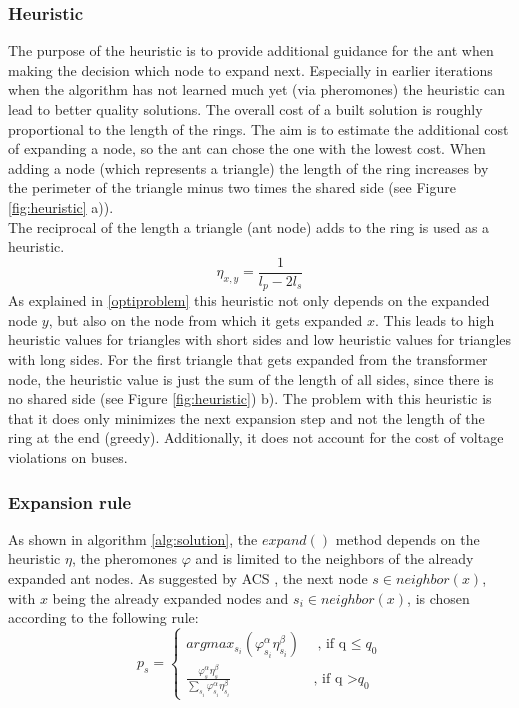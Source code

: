 \subsubsection{Heuristic}
The purpose of the heuristic is to provide additional guidance for the ant when making the decision which node to expand next. Especially in earlier iterations when the algorithm has not learned much yet (via pheromones) the heuristic can lead to better quality solutions. The overall cost of a built solution is roughly proportional to the length of the rings. The aim is to estimate the additional cost of expanding a node, so the ant can chose the one with the lowest cost. When adding a node (which represents a triangle) the length of the ring increases by the perimeter of the triangle minus two times the shared side (see Figure \ref{fig:heuristic} a)).
 \\
The reciprocal of the length a triangle (ant node) adds to the ring is used as a heuristic.
$$\eta_{x,y} = \frac{1}{l_{p} - 2l_{s}}$$
As explained in \ref{optiproblem} this heuristic not only depends on the expanded node $y$, but also on the node from which it gets expanded $x$. This leads to high heuristic values for triangles with short sides and low heuristic values for triangles with long sides. For the first triangle that gets expanded from the transformer node, the heuristic value is just the sum of the length of all sides, since there is no shared side (see Figure \ref{fig:heuristic}) b). The problem with this heuristic is that it does only minimizes the next expansion step and not the length of the ring at the end (greedy). Additionally, it does not account for the cost of voltage violations on buses.

\subsubsection{Expansion rule}
As shown in algorithm \ref{alg:solution}, the $expand()$ method depends on the heuristic $\eta$, the pheromones $\varphi$ and is limited to the neighbors of the already expanded ant nodes. As suggested by ACS \cite{ant_coloy_system}, the next node $s \in neighbor(x)$, with $x$ being the already expanded nodes and $s_i \in neighbor(x)$, is chosen according to the following rule:
$$p_s = \begin{cases}
	argmax_{s_i}(\varphi_{s_i}^\alpha \eta_{s_i}^\beta) & \, \text{, if q $\leq$} q_0\\
	\frac{\varphi_s^\alpha\eta_s^\beta}{\sum_{s_i}\varphi_{s_i}^\alpha\eta_{s_i}^\beta} & \, \text{, if q >} q_0
\end{cases}$$

